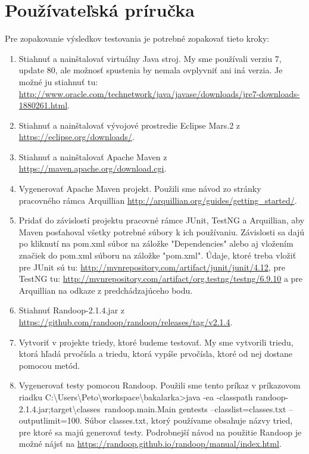 \documentclass[11pt,twoside,slovak,a4paper]{article}
\begin{document}
 	\newpage
 	\section{Používateľská príručka}
 	
 	Pre zopakovanie výsledkov testovania je potrebné zopakovať tieto kroky:
 	
 	\begin{enumerate}
 		\item Stiahnuť a nainštalovať virtuálny Java stroj. My sme používali verziu 7, update 80, ale možnosť spustenia by nemala ovplyvniť ani iná verzia. Je možné ju stiahnuť tu: \url{http://www.oracle.com/technetwork/java/javase/downloads/jre7-downloads-1880261.html}.
 		\item Stiahnuť a nainštalovať vývojové prostredie Eclipse Mars.2 z \url{https://eclipse.org/downloads/}.
 		\item Stiahnuť a nainštalovať Apache Maven z  \url{https://maven.apache.org/download.cgi}.
 		\item Vygenerovať Apache Maven projekt. Použili sme návod zo stránky pracovného rámca Arquillian \url{http://arquillian.org/guides/getting_started/}.
 		\item Pridať do závislostí projektu pracovné rámce JUnit, TestNG a Arquillian, aby Maven posťahoval všetky potrebné súbory k ich používaniu. Závislosti sa dajú po kliknutí na pom.xml súbor na záložke "Dependencies" alebo aj vložením značiek do pom.xml súboru na záložke "pom.xml". Údaje, ktoré treba vložiť pre JUnit sú tu: \url{http://mvnrepository.com/artifact/junit/junit/4.12}, pre TestNG tu: \url{http://mvnrepository.com/artifact/org.testng/testng/6.9.10} a pre Arquillian na odkaze z predchádzajúceho bodu.
 		\item Stiahnuť Randoop-2.1.4.jar z \url{https://github.com/randoop/randoop/releases/tag/v2.1.4}.
 		\item Vytvoriť v projekte triedy, ktoré budeme testovať. My sme vytvorili triedu, ktorá hľadá prvočísla a triedu, ktorá vypíše prvočísla, ktoré od nej dostane pomocou metód.
 		\item Vygenerovať testy pomocou Randoop. Použili sme tento príkaz v príkazovom riadku {C:\textbackslash Users\textbackslash Peto\textbackslash workspace\textbackslash bakalarka>java -ea -classpath randoop-2.1.4.jar;target\textbackslash classes\ randoop.main.Main gentests --classlist=classes.txt --outputlimit=100}. Súbor classes.txt, ktorý používame obsahuje názvy tried, pre ktoré sa majú generovať testy. Podrobnejší návod na použitie Randoop je možné nájsť na \url{https://randoop.github.io/randoop/manual/index.html}.

\end{enumerate}
\end{document}

